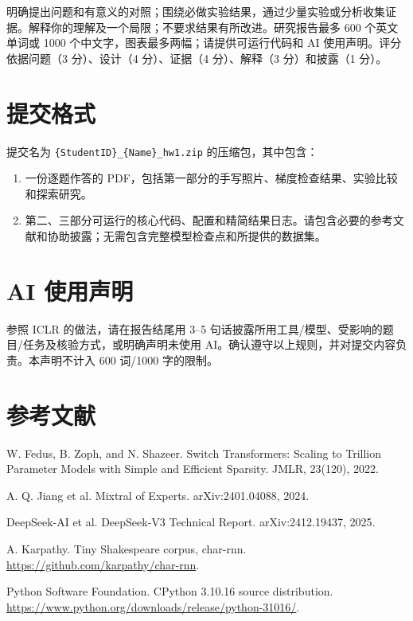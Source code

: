 \documentclass[UTF8,11pt,oneside]{ctexart}
\begin{document}
明确提出问题和有意义的对照；围绕必做实验结果，通过少量实验或分析收集证据。解释你的理解及一个局限；不要求结果有所改进。研究报告最多 600 个英文单词或 1000 个中文字，图表最多两幅；请提供可运行代码和 AI 使用声明。评分依据问题（3 分）、设计（4 分）、证据（4 分）、解释（3 分）和披露（1 分）。

\section{提交格式}
提交名为 \texttt{\{StudentID\}\_\{Name\}\_hw1.zip} 的压缩包，其中包含：
\begin{enumerate}
\item 一份逐题作答的 PDF，包括第一部分的手写照片、梯度检查结果、实验比较和探索研究。
\item 第二、三部分可运行的核心代码、配置和精简结果日志。请包含必要的参考文献和协助披露；无需包含完整模型检查点和所提供的数据集。
\end{enumerate}

\section*{AI 使用声明}
参照 ICLR 的做法，请在报告结尾用 3--5 句话披露所用工具/模型、受影响的题目/任务及核验方式，或明确声明未使用 AI。确认遵守以上规则，并对提交内容负责。本声明不计入 600 词/1000 字的限制。

\section*{参考文献}
\footnotesize
\begin{enumerate}[label={[\arabic*]}]
\item W. Fedus, B. Zoph, and N. Shazeer. Switch Transformers: Scaling to Trillion Parameter Models with Simple and Efficient Sparsity. JMLR, 23(120), 2022.
\item A. Q. Jiang et al. Mixtral of Experts. arXiv:2401.04088, 2024.
\item DeepSeek-AI et al. DeepSeek-V3 Technical Report. arXiv:2412.19437, 2025.
\item A. Karpathy. Tiny Shakespeare corpus, char-rnn. \url{https://github.com/karpathy/char-rnn}.
\item Python Software Foundation. CPython 3.10.16 source distribution. \url{https://www.python.org/downloads/release/python-31016/}.
\end{enumerate}
\end{document}
